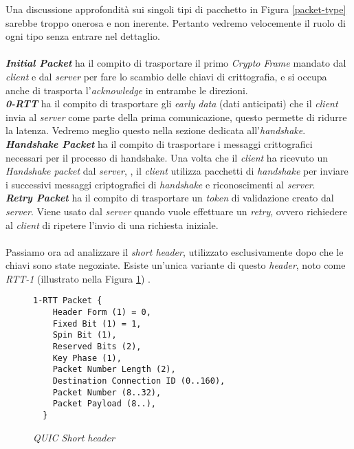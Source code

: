 \noindent Una discussione approfondità sui singoli tipi di pacchetto in Figura \ref{packet-type} sarebbe troppo onerosa e non inerente. Pertanto vedremo velocemente il ruolo di ogni tipo senza entrare nel dettaglio. 
\\\\
\indent \textbf{\emph{Initial Packet}} ha il compito di trasportare il primo \emph{Crypto Frame} mandato dal \emph{client} e dal \emph{server} per fare lo scambio delle chiavi di crittografia, e si occupa anche di trasporta l'\emph{acknowledge} in entrambe le direzioni.
\\
\indent \textbf{\emph{0-RTT}}  ha il compito di trasportare gli \emph{early data} (dati anticipati) che il \emph{client} invia al \emph{server} come parte della prima comunicazione, questo permette di ridurre la latenza. Vedremo meglio questo nella sezione dedicata all'\emph{handshake}.
\\
\indent \textbf{\emph{Handshake Packet}}  ha il compito di trasportare i messaggi crittografici necessari per il processo di handshake. Una volta che il \emph{client} ha ricevuto un \emph{Handshake packet} dal \emph{server}, , il \emph{client} utilizza pacchetti di \emph{handshake} per inviare i successivi messaggi criptografici di \emph{handshake} e riconoscimenti al \emph{server}.
\\
\indent \textbf{\emph{Retry Packet}}  ha il compito di trasportare un \emph{token} di validazione creato dal \emph{server}. Viene usato dal \emph{server} quando vuole effettuare un \emph{retry}, ovvero richiedere al \emph{client} di ripetere l'invio di una richiesta iniziale.
\\\\
Passiamo ora ad analizzare il \emph{short header}, utilizzato esclusivamente dopo che le chiavi sono state negoziate. Esiste un'unica variante di questo \emph{header}, noto come \emph{RTT-1} (illustrato nella Figura \ref{short-header}) \cite{site:Short-header}.
\begin{figure}[!h]
    \centering
    \begin{small}
    \begin{BVerbatim}
1-RTT Packet {
    Header Form (1) = 0,
    Fixed Bit (1) = 1,
    Spin Bit (1),
    Reserved Bits (2),
    Key Phase (1),
    Packet Number Length (2),
    Destination Connection ID (0..160),
    Packet Number (8..32),
    Packet Payload (8..),
  }
    \end{BVerbatim}
\end{small}
    \caption{\emph{QUIC Short header}}
    \label{short-header}
\end{figure}
